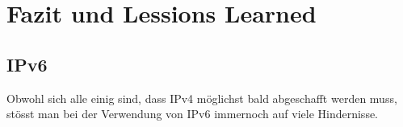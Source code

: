\section{Fazit und Lessions Learned}
\label{sec:openims_fazit}

\subsection{IPv6}
Obwohl sich alle einig sind, dass IPv4 möglichst bald abgeschafft werden muss, stösst man bei der Verwendung von IPv6  immernoch auf viele Hindernisse.
